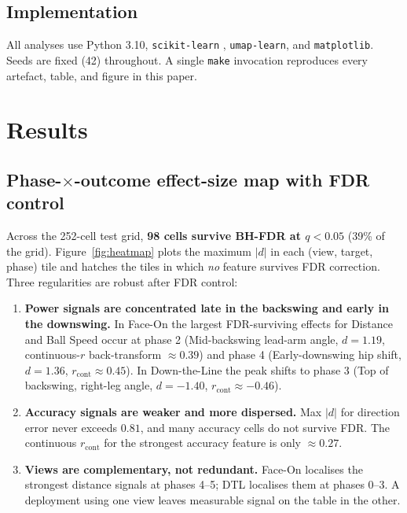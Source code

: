 \documentclass[11pt,a4paper]{article}
\begin{document}
\subsection{Implementation}
All analyses use Python 3.10, \texttt{scikit-learn} \citep{pedregosa2011scikit}, \texttt{umap-learn}, and
\texttt{matplotlib}.  Seeds are fixed (42) throughout.  A single \texttt{make} invocation reproduces every
artefact, table, and figure in this paper.

\section{Results}

\subsection{Phase-$\times$-outcome effect-size map with FDR control}
\label{sec:phase-map}

Across the 252-cell test grid, \textbf{98 cells survive BH-FDR at $q<0.05$} (39\% of the grid).
Figure~\ref{fig:heatmap} plots the maximum $|d|$ in each (view, target, phase) tile and hatches the tiles in
which \emph{no} feature survives FDR correction.  Three regularities are robust after FDR control:

\begin{enumerate}
    \item \textbf{Power signals are concentrated late in the backswing and early in the downswing.}
          In Face-On the largest FDR-surviving effects for Distance and Ball Speed occur at phase 2
          (Mid-backswing lead-arm angle, $d=1.19$, continuous-$r$ back-transform $\approx 0.39$) and phase 4
          (Early-downswing hip shift, $d=1.36$, $r_{\text{cont}}\approx 0.45$).  In Down-the-Line the peak
          shifts to phase 3 (Top of backswing, right-leg angle, $d=-1.40$, $r_{\text{cont}}\approx -0.46$).
    \item \textbf{Accuracy signals are weaker and more dispersed.}
          Max $|d|$ for direction error never exceeds $0.81$, and many accuracy cells do not survive FDR.
          The continuous $r_{\text{cont}}$ for the strongest accuracy feature is only $\approx 0.27$.
    \item \textbf{Views are complementary, not redundant.}
          Face-On localises the strongest distance signals at phases 4--5; DTL localises them at phases 0--3.
          A deployment using one view leaves measurable signal on the table in the other.
\end{enumerate}
\end{document}
